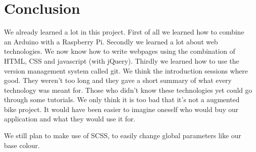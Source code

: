 \section{Conclusion}
We already learned a lot in this project. First of all we learned how to combine an
Arduino with a Raspberry Pi. Secondly we learned a lot about web technologies. We now
know how to write webpages using the combination of HTML, CSS and javascript (with
jQuery). Thirdly we learned how to use the version management system called git.
We think the introduction sessions where good. They weren't too long and they gave
a short summary of what every technology was meant for. Those who didn't know these
technologies yet could go through some tutorials. We only think it is too bad that it's
not a augmented bike project. It would have been easier to imagine oneself who would buy
our application and what they would use it for.

We still plan to make use of SCSS, to easily change global parameters like our base colour.
